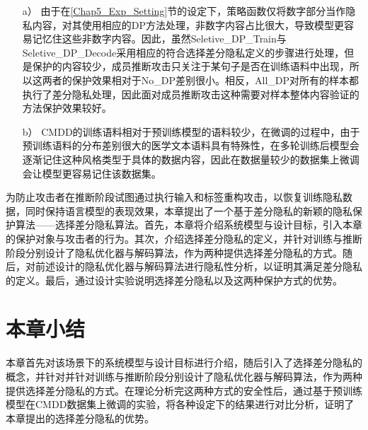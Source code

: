 \begin{itemize}
	\item [a）]
	由于在\ref{Chap5_Exp_Setting}节的设定下，策略函数仅将数字部分当作隐私内容，对其使用相应的DP方法处理，非数字内容占比很大，导致模型更容易记忆住这些非数字内容。因此，虽然Seletive\_DP\_Train与Seletive\_DP\_Decode采用相应的符合选择差分隐私定义的步骤进行处理，但是保护的内容较少，成员推断攻击只关注于某句子是否在训练语料中出现，所以这两者的保护效果相对于No\_DP差别很小。相反，All\_DP对所有的样本都执行了差分隐私处理，因此面对成员推断攻击这种需要对样本整体内容验证的方法保护效果较好。
	\item [b）]
	CMDD的训练语料相对于预训练模型的语料较少，在微调的过程中，由于预训练语料的分布差别很大的医学文本语料具有特殊性，在多轮训练后模型会逐渐记住这种风格类型于具体的数据内容，因此在数据量较少的数据集上微调会让模型更容易记住该数据集。
	
\end{itemize}

%
为防止攻击者在推断阶段试图通过执行输入和标签重构攻击，以恢复训练隐私数据，同时保持语言模型的表现效果，本章提出了一个基于差分隐私的新颖的隐私保护算法——选择差分隐私算法。首先，本章将介绍系统模型与设计目标，引入本章的保护对象与攻击者的行为。其次，介绍选择差分隐私的定义，并针对训练与推断阶段分别设计了隐私优化器与解码算法，作为两种提供选择差分隐私的方式。随后，对前述设计的隐私优化器与解码算法进行隐私性分析，以证明其满足差分隐私的定义。最后，通过设计实验说明选择差分隐私以及这两种保护方式的优势。


\section{本章小结}

本章首先对该场景下的系统模型与设计目标进行介绍，随后引入了选择差分隐私的概念，并针对并针对训练与推断阶段分别设计了隐私优化器与解码算法，作为两种提供选择差分隐私的方式。在理论分析完这两种方式的安全性后，通过基于预训练模型在CMDD数据集上微调的实验，将各种设定下的结果进行对比分析，证明了本章提出的选择差分隐私的优势。